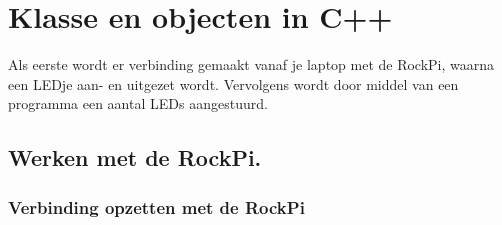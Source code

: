 \chapter{Klasse en objecten in C++}
Als eerste wordt er verbinding gemaakt vanaf je laptop met de RockPi, waarna een LEDje aan- en uitgezet wordt. Vervolgens wordt door middel van een programma een aantal LEDs aangestuurd.

\section{Werken met de RockPi.}

\subsection{Verbinding opzetten met de RockPi}\label{chp:contactPi}


